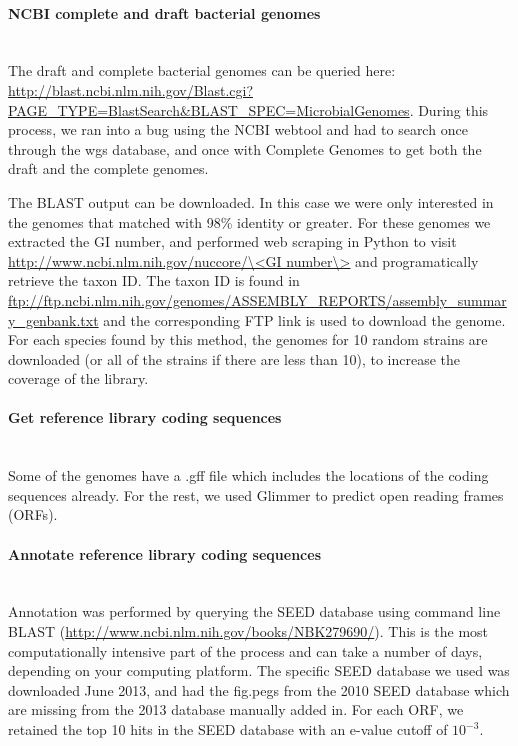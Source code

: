 \paragraph{NCBI complete and draft bacterial genomes}\mbox{}\\
The draft and complete bacterial genomes can be queried here: \url{http://blast.ncbi.nlm.nih.gov/Blast.cgi?PAGE_TYPE=BlastSearch&BLAST_SPEC=MicrobialGenomes}. During this process, we ran into a bug using the NCBI webtool and had to search once through the wgs database, and once with Complete Genomes to get both the draft and the complete genomes.

The BLAST output can be downloaded. In this case we were only interested in the genomes that matched with 98\% identity or greater. For these genomes we extracted the GI number, and performed web scraping in Python to visit \url{http://www.ncbi.nlm.nih.gov/nuccore/\<GI number\>} and programatically retrieve the taxon ID. The taxon ID is found in \url{ftp://ftp.ncbi.nlm.nih.gov/genomes/ASSEMBLY_REPORTS/assembly_summary_genbank.txt} and the corresponding FTP link is used to download the genome. For each species found by this method, the genomes for 10 random strains are downloaded (or all of the strains if there are less than 10), to increase the coverage of the library.

\paragraph{Get reference library coding sequences}\mbox{}\\
Some of the genomes have a .gff file which includes the locations of the coding sequences already. For the rest, we used Glimmer \cite{delcher2007identifying} to predict open reading frames (ORFs).

\paragraph{Annotate reference library coding sequences}\mbox{}\\
Annotation was performed by querying the SEED database \cite{overbeek2005subsystems} using command line BLAST (\url{http://www.ncbi.nlm.nih.gov/books/NBK279690/}). This is the most computationally intensive part of the process and can take a number of days, depending on your computing platform. The specific SEED database we used was downloaded June 2013, and had the fig.pegs from the 2010 SEED database which are missing from the 2013 database manually added in. For each ORF, we retained the top 10 hits in the SEED database with an e-value cutoff of $10^{-3}$.

